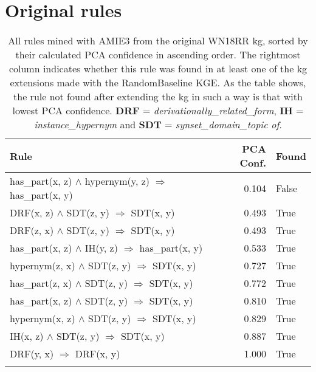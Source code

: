 \chapter{Original rules}
\begin{longtable}{lrl}
\toprule
                                                                                                      Rule &  PCA Conf. &  Found \\
\midrule
                                               has\_part(x, z) $\wedge$ hypernym(y, z)   $\Rightarrow$ has\_part(x, y) &           0.104 &                    False \\
DRF(x, z) $\wedge$ SDT(z, y)   $\Rightarrow$ SDT(x, y) &           0.493 &                     True \\
DRF(z, x) $\wedge$ SDT(z, y)   $\Rightarrow$ SDT(x, y) &           0.493 &                     True \\
                                      has\_part(x, z) $\wedge$ IH(y, z)   $\Rightarrow$ has\_part(x, y) &           0.533 &                     True \\
                   hypernym(z, x) $\wedge$ SDT(z, y)   $\Rightarrow$ SDT(x, y) &           0.727 &                     True \\
                   has\_part(z, x) $\wedge$ SDT(z, y)   $\Rightarrow$ SDT(x, y) &           0.772 &                     True \\
                   has\_part(x, z) $\wedge$ SDT(z, y)   $\Rightarrow$ SDT(x, y) &           0.810 &                     True \\
                   hypernym(x, z) $\wedge$ SDT(z, y)   $\Rightarrow$ SDT(x, y) &           0.829 &                     True \\
          IH(x, z) $\wedge$ SDT(z, y)   $\Rightarrow$ SDT(x, y) &           0.887 &                     True \\
                            DRF(y, x)   $\Rightarrow$ DRF(x, y) &           1.000 &                     True \\
\bottomrule
\caption[Original rules listed WN18RR KG]{All rules mined with AMIE3 from the original WN18RR \gls{kg}, sorted by their calculated PCA confidence in ascending order. The rightmost column indicates whether this rule was found in at least one of the \gls{kg} extensions made with the RandomBaseline KGE. As the table shows, the rule not found after extending the \gls{kg} in such a way is that with lowest PCA confidence. \textbf{DRF} = \textit{derivationally\_related\_form}, \textbf{IH} = \textit{instance\_hypernym} and \textbf{SDT} = \textit{synset\_domain\_topic of}.}
\label{original_rules_found_by_baseline_WN18RR}
\end{longtable}

